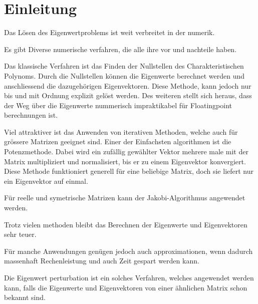 %
%
%
\section{Einleitung\label{ew:section:einleitung}}

Das Lösen des Eigenwertproblems ist  weit verbreitet in der numerik.

Es gibt Diverse numerische verfahren, die alle ihre vor und nachteile haben.

Das klassische Verfahren ist das Finden der Nullstellen des Charakteristischen Polynoms.
Durch die Nullstellen können die Eigenwerte berechnet werden und anschliessend die dazugehörigen Eigenvektoren.
Diese Methode, kann jedoch nur bis und mit Ordnung explizit gelöst werden.
Des weiteren stellt sich heraus, dass der Weg über die Eigenwerte nummerisch impraktikabel für Floatingpoint berechnungen ist. 

Viel attraktiver ist das Anwenden von iterativen Methoden, welche auch für grössere Matrizen geeignet sind.
Einer der Einfachsten algorithmen ist die Potenzmethode.
Dabei wird ein zufällig gewählter Vektor mehrere male mit der Matrix multipliziert und normalisiert, bis er zu einem Eigenvektor konvergiert.
Diese Methode funktioniert generell für eine beliebige Matrix, doch sie liefert nur ein Eigenvektor auf einmal.

Für reelle und symetrische Matrizen kann der Jakobi-Algorithmus angewendet werden. %

Trotz vielen methoden bleibt das Berechnen der Eigenwerte und Eigenvektoren sehr teuer.

Für manche Anwendungen genügen jedoch auch approximationen, wenn dadurch massenhaft Rechenleistung und auch Zeit gespart werden kann.

Die Eigenwert perturbation ist ein solches Verfahren, welches angewendet werden kann, falls die Eigenwerte und Eigenvektoren von einer ähnlichen Matrix schon bekannt sind.